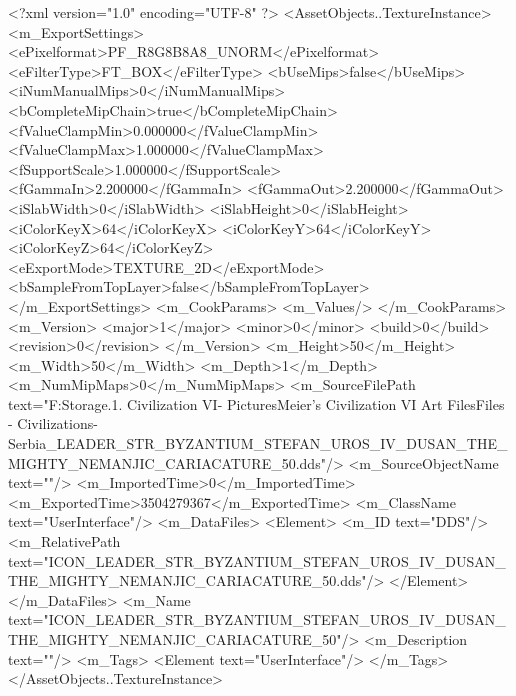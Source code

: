 <?xml version="1.0" encoding="UTF-8" ?>
<AssetObjects..TextureInstance>
	<m_ExportSettings>
		<ePixelformat>PF_R8G8B8A8_UNORM</ePixelformat>
		<eFilterType>FT_BOX</eFilterType>
		<bUseMips>false</bUseMips>
		<iNumManualMips>0</iNumManualMips>
		<bCompleteMipChain>true</bCompleteMipChain>
		<fValueClampMin>0.000000</fValueClampMin>
		<fValueClampMax>1.000000</fValueClampMax>
		<fSupportScale>1.000000</fSupportScale>
		<fGammaIn>2.200000</fGammaIn>
		<fGammaOut>2.200000</fGammaOut>
		<iSlabWidth>0</iSlabWidth>
		<iSlabHeight>0</iSlabHeight>
		<iColorKeyX>64</iColorKeyX>
		<iColorKeyY>64</iColorKeyY>
		<iColorKeyZ>64</iColorKeyZ>
		<eExportMode>TEXTURE_2D</eExportMode>
		<bSampleFromTopLayer>false</bSampleFromTopLayer>
	</m_ExportSettings>
	<m_CookParams>
		<m_Values/>
	</m_CookParams>
	<m_Version>
		<major>1</major>
		<minor>0</minor>
		<build>0</build>
		<revision>0</revision>
	</m_Version>
	<m_Height>50</m_Height>
	<m_Width>50</m_Width>
	<m_Depth>1</m_Depth>
	<m_NumMipMaps>0</m_NumMipMaps>
	<m_SourceFilePath text="F:\Mod Storage\2.1. Civilization VI\Mods\Archive - Pictures\Sid Meier's Civilization VI Art Files\Art Files - Civilizations\Civilization - Serbia\ICON_LEADER_STR_BYZANTIUM_STEFAN_UROS_IV_DUSAN_THE_MIGHTY_NEMANJIC_CARIACATURE_50.dds"/>
	<m_SourceObjectName text=""/>
	<m_ImportedTime>0</m_ImportedTime>
	<m_ExportedTime>3504279367</m_ExportedTime>
	<m_ClassName text="UserInterface"/>
	<m_DataFiles>
		<Element>
			<m_ID text="DDS"/>
			<m_RelativePath text="ICON_LEADER_STR_BYZANTIUM_STEFAN_UROS_IV_DUSAN_THE_MIGHTY_NEMANJIC_CARIACATURE_50.dds"/>
		</Element>
	</m_DataFiles>
	<m_Name text="ICON_LEADER_STR_BYZANTIUM_STEFAN_UROS_IV_DUSAN_THE_MIGHTY_NEMANJIC_CARIACATURE_50"/>
	<m_Description text=""/>
	<m_Tags>
		<Element text="UserInterface"/>
	</m_Tags>
</AssetObjects..TextureInstance>

